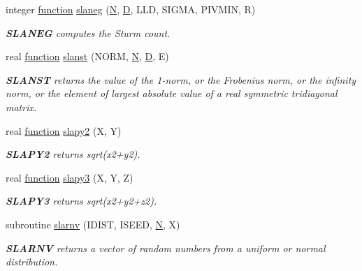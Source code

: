\begin{DoxyCompactItemize}
integer \hyperlink{afunc_8m_a7b5e596df91eadea6c537c0825e894a7}{function} \hyperlink{group__auxOTHERauxiliary_ga7ea5fb550bbab683a539b551e3496bcc}{slaneg} (\hyperlink{polmisc_8c_a0240ac851181b84ac374872dc5434ee4}{N}, \hyperlink{odrpack_8h_a7dae6ea403d00f3687f24a874e67d139}{D}, L\+L\+D, S\+I\+G\+M\+A, P\+I\+V\+M\+I\+N, R)
\begin{DoxyCompactList}\small\item\em {\bfseries S\+L\+A\+N\+E\+G} computes the Sturm count. \end{DoxyCompactList}\item 
real \hyperlink{afunc_8m_a7b5e596df91eadea6c537c0825e894a7}{function} \hyperlink{group__auxOTHERauxiliary_ga3f856bc9099be84550d6c98ed9a3c810}{slanst} (N\+O\+R\+M, \hyperlink{polmisc_8c_a0240ac851181b84ac374872dc5434ee4}{N}, \hyperlink{odrpack_8h_a7dae6ea403d00f3687f24a874e67d139}{D}, E)
\begin{DoxyCompactList}\small\item\em {\bfseries S\+L\+A\+N\+S\+T} returns the value of the 1-\/norm, or the Frobenius norm, or the infinity norm, or the element of largest absolute value of a real symmetric tridiagonal matrix. \end{DoxyCompactList}\item 
real \hyperlink{afunc_8m_a7b5e596df91eadea6c537c0825e894a7}{function} \hyperlink{group__auxOTHERauxiliary_gabfcdad5f1d5d0193f7285e018824aa66}{slapy2} (X, Y)
\begin{DoxyCompactList}\small\item\em {\bfseries S\+L\+A\+P\+Y2} returns sqrt(x2+y2). \end{DoxyCompactList}\item 
real \hyperlink{afunc_8m_a7b5e596df91eadea6c537c0825e894a7}{function} \hyperlink{group__auxOTHERauxiliary_gadab147cb12ea8d677598a5aad10f7e4c}{slapy3} (X, Y, Z)
\begin{DoxyCompactList}\small\item\em {\bfseries S\+L\+A\+P\+Y3} returns sqrt(x2+y2+z2). \end{DoxyCompactList}\item 
subroutine \hyperlink{group__auxOTHERauxiliary_ga379b09e3d4e7635db614d3b3973db5e7}{slarnv} (I\+D\+I\+S\+T, I\+S\+E\+E\+D, \hyperlink{polmisc_8c_a0240ac851181b84ac374872dc5434ee4}{N}, X)
\begin{DoxyCompactList}\small\item\em {\bfseries S\+L\+A\+R\+N\+V} returns a vector of random numbers from a uniform or normal distribution. \end{DoxyCompactList}\item 

\end{DoxyCompactItemize}
